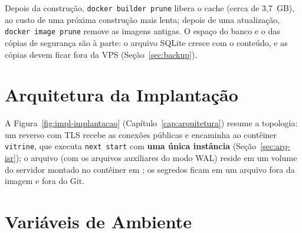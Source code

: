 Depois da construção, \texttt{docker builder prune} libera o cache (cerca de 3,7~GB), ao custo de uma próxima construção mais lenta; depois de uma atualização, \texttt{docker image prune} remove as imagens antigas. O espaço do banco e o das cópias de segurança são à parte: o arquivo SQLite cresce com o conteúdo, e as cópias devem ficar fora da VPS (Seção~\ref{sec:backup}).

\section{Arquitetura da Implantação}

A Figura~\ref{fig:impl-implantacao} (Capítulo~\ref{cap:arquitetura}) resume a topologia: um  reverso com TLS recebe as conexões públicas e encaminha ao contêiner \texttt{vitrine}, que executa \texttt{next start} com \textbf{uma única instância} (Seção~\ref{sec:arq-isr}); o arquivo  (com os arquivos auxiliares do modo WAL) reside em um volume do servidor montado no contêiner em ; os segredos ficam em um arquivo  fora da imagem e fora do Git.

\section{Variáveis de Ambiente}

